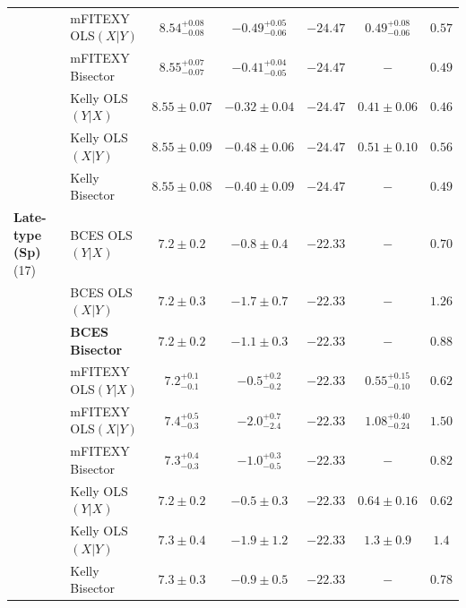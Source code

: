 \documentclass[preprint2]{emulateapj}
\begin{document}
\begin{table}
\begin{tabular}{llccccc}
                             & mFITEXY OLS$(X|Y)$ & $8.54^{+0.08}_{-0.08}$ & $-0.49^{+0.05}_{-0.06}$ & $-24.47$ & $0.49^{+0.08}_{-0.06}$ & $0.57$\\
                             & mFITEXY Bisector   & $8.55^{+0.07}_{-0.07}$ & $-0.41^{+0.04}_{-0.05}$ & $-24.47$ & $-$    & $0.49$ \\
                             & Kelly OLS$(Y|X)$  & $8.55 \pm 0.07$ & $-0.32 \pm 0.04$ & $-24.47$ & $0.41 \pm 0.06$ & $0.46$ \\
                             & Kelly OLS$(X|Y)$  & $8.55 \pm 0.09$ & $-0.48 \pm 0.06$ & $-24.47$ & $0.51 \pm 0.10$ & $0.56$ \\
                             & Kelly Bisector    & $8.55 \pm 0.08$ & $-0.40 \pm 0.09$ & $-24.47$ & $-$    & $0.49$ \\ [0.5em]

{\bf Late-type (Sp)} (17) & BCES OLS$(Y|X)$    & $7.2 \pm 0.2$ & $-0.8 \pm 0.4$ & $-22.33$ & $-$    & $0.70$ \\
                          & BCES OLS$(X|Y)$    & $7.2 \pm 0.3$ & $-1.7 \pm 0.7$ & $-22.33$ & $-$    & $1.26$ \\
                          & {\bf BCES Bisector}& $\boldsymbol{7.2 \pm 0.2}$ & $\boldsymbol{-1.1 \pm 0.3}$ & $\boldsymbol{-22.33}$ & $-$    & $\boldsymbol{0.88}$ \\
                          & mFITEXY OLS$(Y|X)$ & $7.2^{+0.1}_{-0.1}$ & $-0.5^{+0.2}_{-0.2}$ & $-22.33$ & $0.55^{+0.15}_{-0.10}$ & $0.62$ \\
                          & mFITEXY OLS$(X|Y)$ & $7.4^{+0.5}_{-0.3}$ & $-2.0^{+0.7}_{-2.4}$ & $-22.33$ & $1.08^{+0.40}_{-0.24}$ & $1.50$ \\
                          & mFITEXY Bisector   & $7.3^{+0.4}_{-0.3}$ & $-1.0^{+0.3}_{-0.5}$ & $-22.33$ & $-$    & $0.82$ \\
                          & Kelly OLS$(Y|X)$  & $7.2 \pm 0.2$ & $-0.5 \pm 0.3$ & $-22.33$ & $0.64 \pm 0.16$ & $0.62$ \\
                          & Kelly OLS$(X|Y)$  & $7.3 \pm 0.4$ & $-1.9 \pm 1.2$ & $-22.33$ & $1.3 \pm 0.9$ & $1.4$ \\
                          & Kelly Bisector    & $7.3 \pm 0.3$ & $-0.9 \pm 0.5$ & $-22.33$ & $-$    & $0.78$ \\

\hline 
\hline
\end{tabular}
\label{tab:lreg} 
\end{table}
\end{document}
